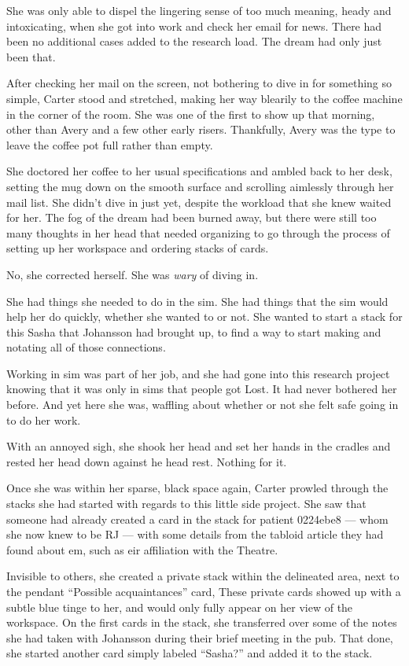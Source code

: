 She was only able to dispel the lingering sense of too much meaning, heady and intoxicating, when she got into work and check her email for news. There had been no additional cases added to the research load. The dream had only just been that.

After checking her mail on the screen, not bothering to dive in for something so simple, Carter stood and stretched, making her way blearily to the coffee machine in the corner of the room. She was one of the first to show up that morning, other than Avery and a few other early risers. Thankfully, Avery was the type to leave the coffee pot full rather than empty.

She doctored her coffee to her usual specifications and ambled back to her desk, setting the mug down on the smooth surface and scrolling aimlessly through her mail list. She didn't dive in just yet, despite the workload that she knew waited for her. The fog of the dream had been burned away, but there were still too many thoughts in her head that needed organizing to go through the process of setting up her workspace and ordering stacks of cards.

No, she corrected herself. She was \emph{wary} of diving in.

She had things she needed to do in the sim. She had things that the sim would help her do quickly, whether she wanted to or not. She wanted to start a stack for this Sasha that Johansson had brought up, to find a way to start making and notating all of those connections.

Working in sim was part of her job, and she had gone into this research project knowing that it was only in sims that people got Lost. It had never bothered her before. And yet here she was, waffling about whether or not she felt safe going in to do her work.

With an annoyed sigh, she shook her head and set her hands in the cradles and rested her head down against he head rest. Nothing for it.

Once she was within her sparse, black space again, Carter prowled through the stacks she had started with regards to this little side project. She saw that someone had already created a card in the stack for patient 0224ebe8 --- whom she now knew to be RJ --- with some details from the tabloid article they had found about em, such as eir affiliation with the Theatre.

Invisible to others, she created a private stack within the delineated area, next to the pendant ``Possible acquaintances'' card, These private cards showed up with a subtle blue tinge to her, and would only fully appear on her view of the workspace. On the first cards in the stack, she transferred over some of the notes she had taken with Johansson during their brief meeting in the pub. That done, she started another card simply labeled ``Sasha?'' and added it to the stack.

